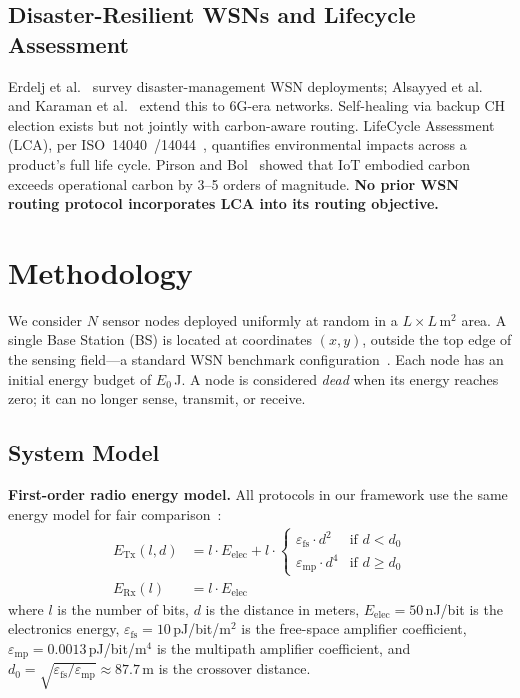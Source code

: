 \subsection{Disaster-Resilient WSNs and Lifecycle Assessment}
Erdelj et al.~\cite{erdelj2017disaster} survey disaster-management WSN deployments; Alsayyed et al.~\cite{alsayyed2025disaster} and Karaman et al.~\cite{karaman2025disaster_survey} extend this to 6G-era networks.
Self-healing via backup CH election exists but not jointly with carbon-aware routing.
LifeCycle Assessment (LCA), per ISO~14040~\cite{iso14040}/14044~\cite{iso14044}, quantifies environmental impacts across a product's full life cycle.
Pirson and Bol~\cite{pirson2021embodied} showed that IoT embodied carbon exceeds operational carbon by 3--5 orders of magnitude.
\textbf{No prior WSN routing protocol incorporates LCA into its routing objective.}



\section{Methodology}
\label{art2:sec:methodology}

We consider $N$ sensor nodes deployed uniformly at random in a $L \times L$\,m$^2$ area.
A single Base Station (BS) is located at coordinates $(x, y)$, outside the top edge of the sensing field---a standard WSN benchmark configuration~\cite{heinzelman2002leach}.
Each node has an initial energy budget of $E_0$\,J.
A node is considered \emph{dead} when its energy reaches zero; it can no longer sense, transmit, or receive.

\subsection{System Model}
\label{art2:sec:system_model}

\textbf{First-order radio energy model.}
All protocols in our framework use the same energy model for fair comparison~\cite{heinzelman2000leach, rappaport2002wireless}:
\begin{align}
    E_{\text{Tx}}(l, d) &= l \cdot E_{\text{elec}} + l \cdot
    \begin{cases}
        \varepsilon_{\text{fs}} \cdot d^2 & \text{if } d < d_0 \\
        \varepsilon_{\text{mp}} \cdot d^4 & \text{if } d \geq d_0
    \end{cases}
    \label{art2:eq:etx} \\
    E_{\text{Rx}}(l) &= l \cdot E_{\text{elec}}
    \label{art2:eq:erx}
\end{align}
where $l$ is the number of bits, $d$ is the distance in meters, $E_{\text{elec}} = 50$\,nJ/bit is the electronics energy, $\varepsilon_{\text{fs}} = 10$\,pJ/bit/m$^2$ is the free-space amplifier coefficient, $\varepsilon_{\text{mp}} = 0.0013$\,pJ/bit/m$^4$ is the multipath amplifier coefficient, and $d_0 = \sqrt{\varepsilon_{\text{fs}}/\varepsilon_{\text{mp}}} \approx 87.7$\,m is the crossover distance.

